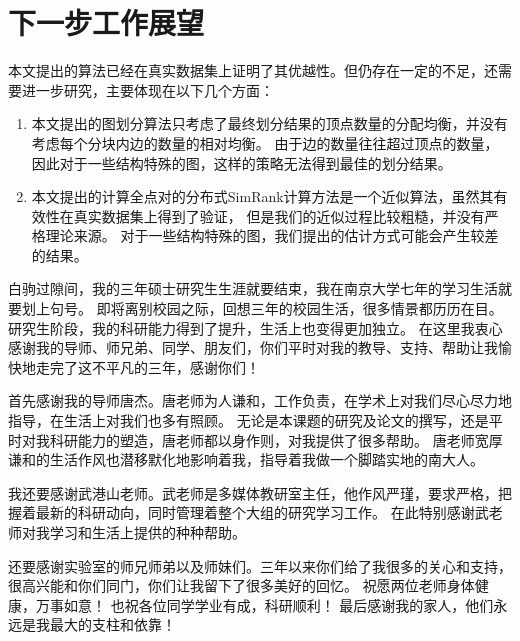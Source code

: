 \documentclass[master]{njuthesis}
\begin{document}
\section{下一步工作展望}
本文提出的算法已经在真实数据集上证明了其优越性。但仍存在一定的不足，还需要进一步研究，主要体现在以下几个方面：
\begin{enumerate}
 \item 本文提出的图划分算法只考虑了最终划分结果的顶点数量的分配均衡，并没有考虑每个分块内边的数量的相对均衡。
 由于边的数量往往超过顶点的数量，因此对于一些结构特殊的图，这样的策略无法得到最佳的划分结果。
 
 \item 本文提出的计算全点对的分布式SimRank计算方法是一个近似算法，虽然其有效性在真实数据集上得到了验证，
 但是我们的近似过程比较粗糙，并没有严格理论来源。 对于一些结构特殊的图，我们提出的估计方式可能会产生较差的结果。
 
\end{enumerate}



\begin{acknowledgement}
白驹过隙间，我的三年硕士研究生生涯就要结束，我在南京大学七年的学习生活就要划上句号。
即将离别校园之际，回想三年的校园生活，很多情景都历历在目。
研究生阶段，我的科研能力得到了提升，生活上也变得更加独立。
在这里我衷心感谢我的导师、师兄弟、同学、朋友们，你们平时对我的教导、支持、帮助让我愉快地走完了这不平凡的三年，感谢你们！

首先感谢我的导师唐杰。唐老师为人谦和，工作负责，在学术上对我们尽心尽力地指导，在生活上对我们也多有照顾。
无论是本课题的研究及论文的撰写，还是平时对我科研能力的塑造，唐老师都以身作则，对我提供了很多帮助。
唐老师宽厚谦和的生活作风也潜移默化地影响着我，指导着我做一个脚踏实地的南大人。

我还要感谢武港山老师。武老师是多媒体教研室主任，他作风严瑾，要求严格，把握着最新的科研动向，同时管理着整个大组的研究学习工作。
在此特别感谢武老师对我学习和生活上提供的种种帮助。

还要感谢实验室的师兄师弟以及师妹们。三年以来你们给了我很多的关心和支持，很高兴能和你们同门，你们让我留下了很多美好的回忆。
祝愿两位老师身体健康，万事如意！ 也祝各位同学学业有成，科研顺利！
最后感谢我的家人，他们永远是我最大的支柱和依靠！

\end{acknowledgement}

\nocite{*}

%
%
\end{document}
